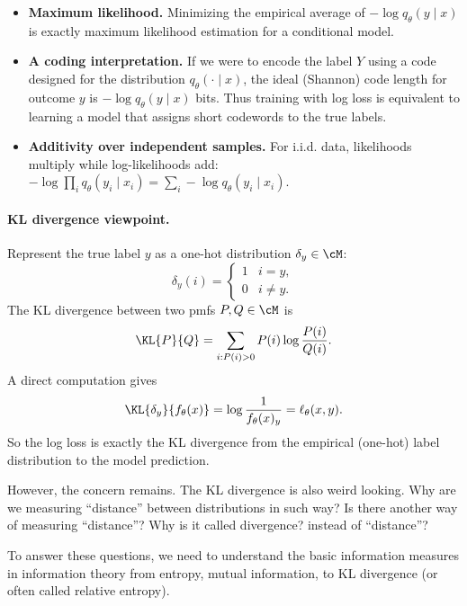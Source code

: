 \begin{itemize}[leftmargin=2em]
    \item \textbf{Maximum likelihood.}
    Minimizing the empirical average of $-\log q_\theta(y\mid x)$ is exactly maximum likelihood estimation for a conditional model.

    \item \textbf{A coding interpretation.}
    If we were to encode the label $Y$ using a code designed for the distribution $q_\theta(\cdot\mid x)$, the ideal (Shannon) code length for outcome $y$ is $-\log q_\theta(y\mid x)$ bits.
    Thus training with log loss is equivalent to learning a model that assigns short codewords to the true labels.

    \item \textbf{Additivity over independent samples.}
    For i.i.d. data, likelihoods multiply while log-likelihoods add:
    \( -\log \prod_i q_\theta(y_i\mid x_i) = \sum_i -\log q_\theta(y_i\mid x_i)\).
\end{itemize}

\paragraph{KL divergence viewpoint.}
Represent the true label $y$ as a one-hot distribution $\delta_y\in\cM$:
\[
\delta_y(i)=\begin{cases}
1 & i=y,\\
0 & i\neq y.
\end{cases}
\]
The KL divergence between two pmfs $P,Q\in\cM$ is
\[
\KL{P}{Q}=\sum_{i:P(i)>0} P(i)\log\frac{P(i)}{Q(i)}.
\]
A direct computation gives
\begin{equation}
    \KL{\delta_y}{f_\theta(x)}
    =\log\frac{1}{f_\theta(x)_y}
    =\ell_\theta(x,y).
\end{equation}
So the log loss is exactly the KL divergence from the empirical (one-hot) label distribution to the model prediction.

However, the concern remains.
The KL divergence is also weird looking.
Why are we measuring ``distance'' between distributions in such way?
Is there another way of measuring ``distance''?
Why is it called divergence? instead of ``distance''?

To answer these questions, we need to understand the basic information measures in information theory
from entropy, mutual information, to KL divergence (or often called relative entropy).



